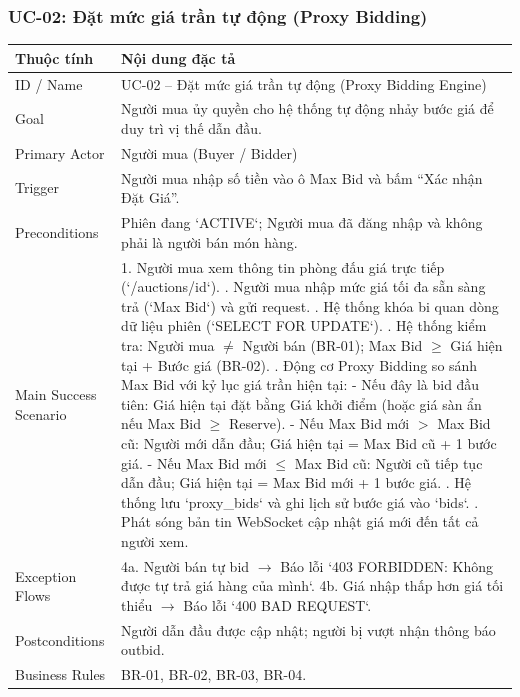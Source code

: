 \documentclass[11pt,a4paper]{article}
\begin{document}
\subsubsection{UC-02: Đặt mức giá trần tự động (Proxy Bidding)}
\begin{table}[H]
    \centering
    \small
    \begin{tabularx}{\textwidth}{|l|X|}
        \hline
        \textbf{Thuộc tính} & \textbf{Nội dung đặc tả} \\ \hline
        ID / Name & UC-02 -- Đặt mức giá trần tự động (Proxy Bidding Engine) \\ \hline
        Goal & Người mua ủy quyền cho hệ thống tự động nhảy bước giá để duy trì vị thế dẫn đầu. \\ \hline
        Primary Actor & Người mua (Buyer / Bidder) \\ \hline
        Trigger & Người mua nhập số tiền vào ô Max Bid và bấm ``Xác nhận Đặt Giá''. \\ \hline
        Preconditions & Phiên đang `ACTIVE`; Người mua đã đăng nhập và không phải là người bán món hàng. \\ \hline
        Main Success Scenario & 
        1. Người mua xem thông tin phòng đấu giá trực tiếp (`/auctions/{id}`). \newline
        2. Người mua nhập mức giá tối đa sẵn sàng trả (`Max Bid`) và gửi request. \newline
        3. Hệ thống khóa bi quan dòng dữ liệu phiên (`SELECT FOR UPDATE`). \newline
        4. Hệ thống kiểm tra: Người mua $\ne$ Người bán (BR-01); Max Bid $\ge$ Giá hiện tại + Bước giá (BR-02). \newline
        5. Động cơ Proxy Bidding so sánh Max Bid với kỷ lục giá trần hiện tại: \newline
           - Nếu đây là bid đầu tiên: Giá hiện tại đặt bằng Giá khởi điểm (hoặc giá sàn ẩn nếu Max Bid $\ge$ Reserve). \newline
           - Nếu Max Bid mới $>$ Max Bid cũ: Người mới dẫn đầu; Giá hiện tại = Max Bid cũ + 1 bước giá. \newline
           - Nếu Max Bid mới $\le$ Max Bid cũ: Người cũ tiếp tục dẫn đầu; Giá hiện tại = Max Bid mới + 1 bước giá. \newline
        6. Hệ thống lưu `proxy_bids` và ghi lịch sử bước giá vào `bids`. \newline
        7. Phát sóng bản tin WebSocket cập nhật giá mới đến tất cả người xem. \\ \hline
        Exception Flows & 
        4a. Người bán tự bid $\rightarrow$ Báo lỗi `403 FORBIDDEN: Không được tự trả giá hàng của mình`. \newline
        4b. Giá nhập thấp hơn giá tối thiểu $\rightarrow$ Báo lỗi `400 BAD REQUEST`. \\ \hline
        Postconditions & Người dẫn đầu được cập nhật; người bị vượt nhận thông báo outbid. \\ \hline
        Business Rules & BR-01, BR-02, BR-03, BR-04. \\ \hline
    \end{tabularx}
\end{table}
\end{document}
